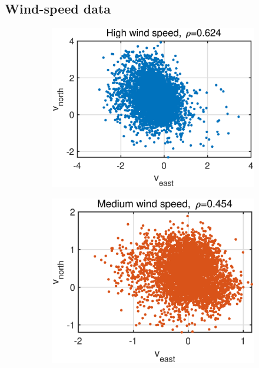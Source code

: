 \subsection{Wind-speed data}
\begin{figure}[htb]
    \centering
    \hspace{-0.4cm}
    \begin{subfigure}[b]{0.3\textwidth}
     \centering
     \includegraphics[width=1.2\textwidth]{fig/31/31b1.eps}
    \end{subfigure}
    \hspace{0.4cm}
    \begin{subfigure}[b]{0.3\textwidth}
     \centering
     \includegraphics[width=1.2\textwidth]{fig/31/31b2.eps}

\end{subfigure}
\end{figure}
